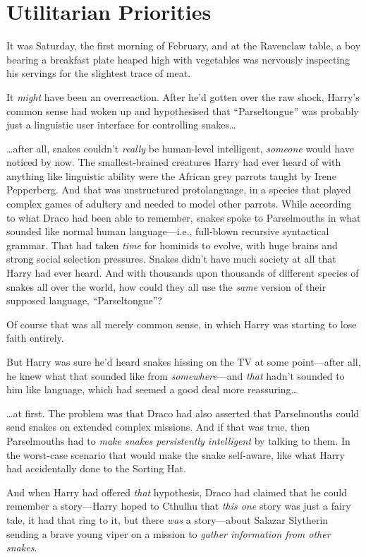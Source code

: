 \chapter{Utilitarian Priorities}

It was Saturday, the first morning of February, and at the Ravenclaw
table, a boy bearing a breakfast plate heaped high with vegetables was
nervously inspecting his servings for the slightest trace of meat.

It \emph{might} have been an overreaction. After he'd gotten over the
raw shock, Harry's common sense had woken up and hypothesised that
``Parseltongue'' was probably just a linguistic user interface for
controlling snakes\ldots{}

\ldots{}after all, snakes couldn't \emph{really} be human-level
intelligent, \emph{someone} would have noticed by now. The
smallest-brained creatures Harry had ever heard of with anything like
linguistic ability were the African grey parrots taught by Irene
Pepperberg. And that was unstructured protolanguage, in a species that
played complex games of adultery and needed to model other parrots.
While according to what Draco had been able to remember, snakes spoke to
Parselmouths in what sounded like normal human language---i.e.,
full-blown recursive syntactical grammar. That had taken \emph{time} for
hominids to evolve, with huge brains and strong social selection
pressures. Snakes didn't have much society at all that Harry had ever
heard. And with thousands upon thousands of different species of snakes
all over the world, how could they all use the \emph{same} version of
their supposed language, ``Parseltongue''?

Of course that was all merely common sense, in which Harry was starting
to lose faith entirely.

But Harry was sure he'd heard snakes hissing on the TV at some
point---after all, he knew what that sounded like from
\emph{somewhere}---and \emph{that} hadn't sounded to him like language,
which had seemed a good deal more reassuring\ldots{}

\ldots{}at first. The problem was that Draco had also asserted that
Parselmouths could send snakes on extended complex missions. And if that
was true, then Parselmouths had to \emph{make snakes persistently
intelligent} by talking to them. In the worst-case scenario that would
make the snake self-aware, like what Harry had accidentally done to the
Sorting Hat.

And when Harry had offered \emph{that} hypothesis, Draco had claimed
that he could remember a story---Harry hoped to Cthulhu that \emph{this
one} story was just a fairy tale, it had that ring to it, but there
\emph{was} a story---about Salazar Slytherin sending a brave young viper
on a mission to \emph{gather information from other snakes.}


